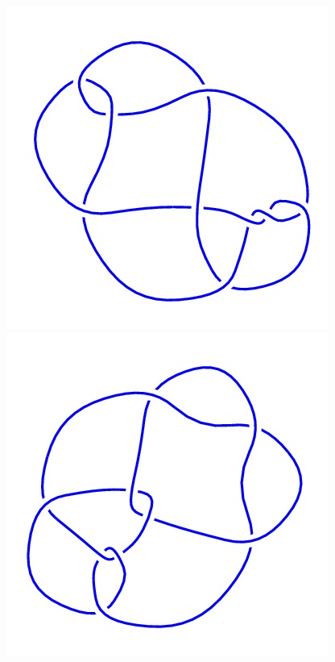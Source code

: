 \begin{figure}[H]
    \begin{minipage}[b]{.18\linewidth}
        \centering
        \includegraphics[width=\linewidth]{../data/9_21.png}
    \end{minipage}
    \begin{minipage}[b]{.18\linewidth}
        \centering
        \includegraphics[width=\linewidth]{../data/9_22.png}

\end{minipage}
\end{figure}
